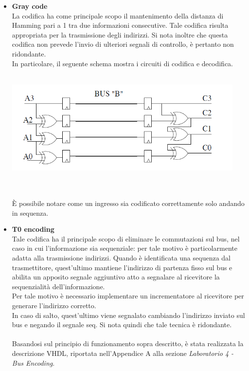 \documentclass[11pt,  english, makeidx, a4paper, titlepage, oneside]{book}
\begin{document}
\begin{itemize}
\newpage
\item \textbf{Gray code}
\\
La codifica ha come principale scopo il mantenimento della distanza di Hamming pari a 1 tra due informazioni consecutive. Tale codifica risulta appropriata per la trasmissione degli indirizzi. Si nota inoltre che questa codifica non prevede l'invio di ulteriori segnali di controllo, è pertanto non ridondante.
\\
In particolare, il seguente schema mostra i circuiti di codifica e decodifica.
\\\\
\centerline{\includegraphics[width=12cm]{./img/Lab_4/gray.png}}
\\\\
È possibile notare come un ingresso sia codificato correttamente solo andando in sequenza.
\item \textbf{T0 encoding}
\\
Tale codifica ha il principale scopo di eliminare le commutazioni sul bus, nel caso in cui l'informazione sia sequenziale: per tale motivo è particolarmente adatta alla trasmissione indirizzi. Quando è identificata una sequenza dal trasmettitore, quest'ultimo mantiene l'indirizzo di partenza fisso sul bus e abilita un apposito segnale aggiuntivo atto a segnalare al ricevitore la sequenzialità dell'informazione.
\\
Per tale motivo è necessario implementare un incrementatore al ricevitore per generare l'indirizzo corretto.
\\
In caso di salto, quest'ultimo viene segnalato cambiando l'indirizzo inviato sul bus e negando il segnale seq.
Si nota quindi che tale tecnica è ridondante.
\\\\
Basandosi sul principio di funzionamento sopra descritto, è stata realizzata la descrizione VHDL, riportata nell'Appendice A alla sezione \textit{Laboratorio 4 - Bus Encoding}.
\end{itemize}
\newpage
\end{document}

